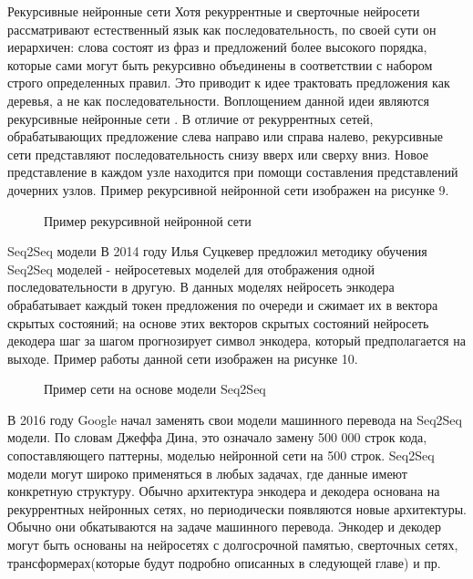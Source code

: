  Рекурсивные нейронные сети
Хотя рекуррентные и сверточные нейросети рассматривают естественный язык как последовательность, по своей сути он иерархичен: слова состоят из фраз и предложений более высокого порядка, которые сами могут быть рекурсивно объединены в соответствии с набором строго определенных правил. Это приводит к идее трактовать предложения как деревья, а не как последовательности. Воплощением данной идеи являются рекурсивные нейронные сети \cite{Socher_Perelygin_Wu_Chuang_Manning_Ng_Potts_2013}. В отличие от рекуррентных сетей, обрабатывающих предложение слева направо или справа налево, рекурсивные сети представляют последовательность снизу вверх или сверху вниз. Новое представление в каждом узле находится при помощи составления представлений дочерних узлов. Пример рекурсивной нейронной сети изображен на рисунке 9.



\begin{figure}[ht]
  \caption{Пример рекурсивной нейронной сети}\label{fig:Neuro5-RNN}
\end{figure}

Seq2Seq  модели
     В 2014 году Илья Суцкевер предложил методику обучения Seq2Seq моделей \cite{Sutskever_Vinyals_Le_2014} - нейросетевых моделей для отображения одной последовательности в другую. В данных моделях нейросеть энкодера обрабатывает каждый токен предложения по очереди  и сжимает их в вектора скрытых состояний; на основе этих векторов скрытых состояний нейросеть декодера шаг за шагом прогнозирует символ энкодера, который предполагается на выходе. Пример работы данной сети изображен на рисунке 10.

\begin{figure}[ht]
  \caption{Пример сети на основе модели Seq2Seq}\label{fig:Neuro6-Seq2Seq}
\end{figure}


    В 2016 году Google начал заменять свои модели машинного перевода на Seq2Seq модели. По словам Джеффа Дина, это означало замену 500 000 строк кода, сопоставляющего паттерны,  моделью нейронной сети на 500 строк. Seq2Seq модели могут широко применяться в любых задачах, где данные имеют конкретную структуру.
Обычно архитектура энкодера и декодера основана на рекуррентных нейронных сетях, но периодически появляются новые архитектуры. Обычно они обкатываются на задаче машинного перевода. Энкодер и декодер могут быть основаны на нейросетях с долгосрочной памятью, сверточных сетях, трансформерах(которые будут подробно описанных в следующей главе) и пр.

